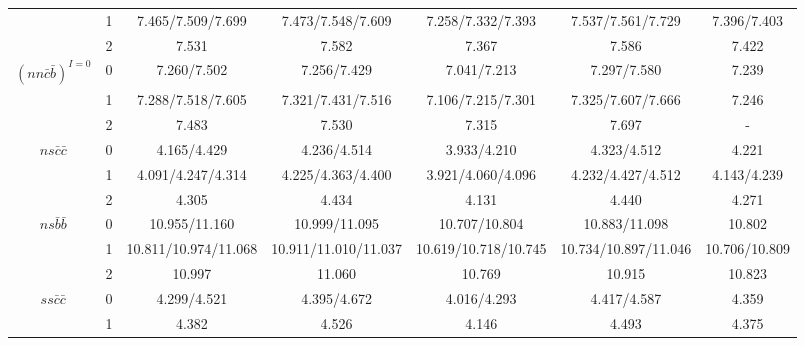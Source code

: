 \documentclass[prd,twocolumn,floatfix,nofootinbib]{revtex4}
\begin{document}
\begin{table}[!htbp]
\begin{tabular}{ccccccc}
                        &1      &7.465/7.509/7.699      &7.473/7.548/7.609                   &7.258/7.332/7.393                   &7.537/7.561/7.729      &7.396/7.403 \\
                        &2      &7.531                  &7.582                               &7.367                               &7.586                  &7.422 \\
        ${(nn\bar{c}\bar{b})}^{I=0}$
                        &0      &7.260/7.502            &7.256/7.429                         &7.041/7.213                         &7.297/7.580            &7.239 \\
                        &1      &7.288/7.518/7.605      &7.321/7.431/7.516                   &7.106/7.215/7.301                   &7.325/7.607/7.666      &7.246 \\
                        &2      &7.483                  &7.530                               &7.315                               &7.697                  &- \\
        $ns\bar{c}\bar{c}$
                        &0      &4.165/4.429            &4.236/4.514                         &3.933/4.210                         &4.323/4.512            &4.221 \\
                        &1      &4.091/4.247/4.314      &4.225/4.363/4.400                   &3.921/4.060/4.096                   &4.232/4.427/4.512      &4.143/4.239 \\
                        &2      &4.305                  &4.434                               &4.131                               &4.440                  &4.271 \\
        $ns\bar{b}\bar{b}$
                        &0      &10.955/11.160          &10.999/11.095                       &10.707/10.804                       &10.883/11.098          &10.802 \\
                        &1      &10.811/10.974/11.068   &10.911/11.010/11.037                &10.619/10.718/10.745                &10.734/10.897/11.046   &10.706/10.809 \\
                        &2      &10.997                 &11.060                              &10.769                              &10.915                 &10.823 \\
        $ss\bar{c}\bar{c}$
                        &0      &4.299/4.521            &4.395/4.672                         &4.016/4.293                         &4.417/4.587            &4.359 \\
                        &1      &4.382                  &4.526                               &4.146                               &4.493                  &4.375 \\

\end{tabular}
\end{table}
\end{document}
